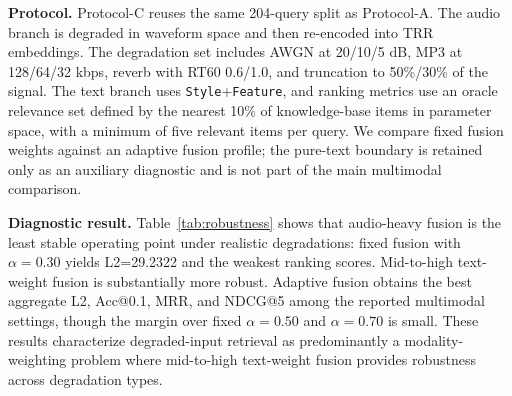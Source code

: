 \textbf{Protocol.} Protocol-C reuses the same 204-query split as Protocol-A. The audio branch is degraded in waveform space and then re-encoded into TRR embeddings. The degradation set includes AWGN at 20/10/5 dB, MP3 at 128/64/32 kbps, reverb with RT60 0.6/1.0, and truncation to 50\%/30\% of the signal. The text branch uses \texttt{Style}+\texttt{Feature}, and ranking metrics use an oracle relevance set defined by the nearest 10\% of knowledge-base items in parameter space, with a minimum of five relevant items per query. We compare fixed fusion weights against an adaptive fusion profile; the pure-text boundary is retained only as an auxiliary diagnostic and is not part of the main multimodal comparison.

\begin{table}[t]
\centering
\caption{Protocol-C: real-degradation fusion robustness on the shared 204-query split. Lower is better for L2; higher is better for all other metrics.}
\label{tab:robustness}
\small
\setlength{\tabcolsep}{3pt}
\end{table}

\textbf{Diagnostic result.} Table~\ref{tab:robustness} shows that audio-heavy fusion is the least stable operating point under realistic degradations: fixed fusion with $\alpha=0.30$ yields L2=29.2322 and the weakest ranking scores. Mid-to-high text-weight fusion is substantially more robust. Adaptive fusion obtains the best aggregate L2, Acc@0.1, MRR, and NDCG@5 among the reported multimodal settings, though the margin over fixed $\alpha=0.50$ and $\alpha=0.70$ is small. These results characterize degraded-input retrieval as predominantly a modality-weighting problem where mid-to-high text-weight fusion provides robustness across degradation types.

